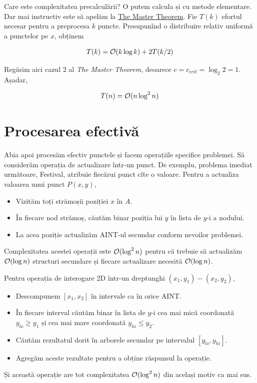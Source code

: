 \documentclass[../main.tex]{subfiles}
\begin{document}
Care este complexitatea precalculării? O putem calcula și cu metode elementare. Dar mai instructiv este să apelăm la \href{https://en.wikipedia.org/wiki/Master_theorem_\%28analysis_of_algorithms\%29}{The Master Theorem}. Fie $T(k)$ efortul necesar pentru a preprocesa $k$ puncte. Presupunînd o distribuire relativ uniformă a punctelor pe $x$, obținem

$$T(k) = \mathcal{O}(k \log k) + 2T(k/2)$$

Regăsim aici cazul 2 al \textit{The Master Theorem}, deoarece $c = c_{crit} = \log_2 2 = 1$. Așadar,

$$T(n) = \mathcal{O}(n \log^2 n)$$

\section{Procesarea efectivă}

Abia apoi procesăm efectiv punctele și facem operațiile specifice problemei. Să considerăm operația de actualizare într-un punct. De exemplu, problema imediat următoare, Festival, atribuie fiecărui punct cîte o valoare. Pentru a actualiza valoarea unui punct $P(x, y)$,

\begin{itemize}
  \item Vizităm toți strămoșii poziției $x$ în $A$.
  \item În fiecare nod strămoș, căutăm binar poziția lui $y$ în lista de $y$-i a nodului.
  \item La acea poziție actualizăm AINT-ul secundar conform nevoilor problemei.
\end{itemize}

Complexitatea acestei operații este $\mathcal{O}(\log^2 n)$ pentru că trebuie să actualizăm $\mathcal{O}(\log n)$ structuri secundare și fiecare actualizare necesită $\mathcal{O}(\log n)$.

Pentru operația de interogare 2D într-un dreptunghi $(x_1, y_1) - (x_2, y_2)$,

\begin{itemize}
  \item Descompunem $[x_1, x_2]$ în intervale ca în orice AINT.
  \item În fiecare interval căutăm binar în lista de $y$-i cea mai mică coordonată $y_{lo} \geq y_1$ și cea mai mare coordonată $y_{hi} \leq y_2$.
  \item Căutăm rezultatul dorit în arborele secundar pe intervalul $[y_{lo}, y_{hi}]$.
  \item Agregăm aceste rezultate pentru a obține răspunsul la operație.
\end{itemize}

Și această operație are tot complexitatea $\mathcal{O}(\log^2 n)$ din același motiv ca mai sus.
\end{document}
